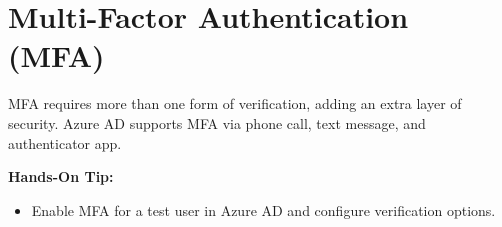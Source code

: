 \documentclass{article}
\begin{document}
\section{Multi-Factor Authentication (MFA)}
MFA requires more than one form of verification, adding an extra layer of security. Azure AD supports MFA via phone call, text message, and authenticator app.

\textbf{Hands-On Tip:}
\begin{itemize}
    \item Enable MFA for a test user in Azure AD and configure verification options.
\end{itemize}
\end{document}
